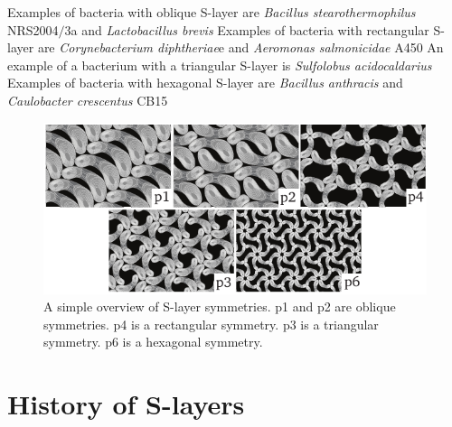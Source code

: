             Examples of bacteria with oblique \acs{S-layer} are \textit{Bacillus stearothermophilus} NRS2004$/$3a and \textit{Lactobacillus brevis}
            Examples of bacteria with rectangular \acs{S-layer} are \textit{Corynebacterium diphtheriae}e and \textit{Aeromonas salmonicidae} A450
            An example of a bacterium with a triangular \ac{S-layer} is \textit{Sulfolobus acidocaldarius}
            Examples of bacteria with hexagonal \acs{S-layer} are
            \textit{Bacillus
            anthracis} and
            \textit{Caulobacter crescentus} CB15

        \begin{figure}[htb] %
                \begin{center}
                    \includegraphics[]{intro/img/symmetries.pdf}
                \end{center}
                \caption[A simple overview of \ac{S-layer} symmetries]{A simple overview of \ac{S-layer} symmetries. p1 and p2 are oblique symmetries. 
                p4 is a rectangular symmetry.  
                p3  is a triangular symmetry. 
                p6 is a hexagonal symmetry.}
        \label{fig:symmetries}
        \end{figure}


    \section{History of S-layers} %
    \label{sec:history_of_s_layers}

